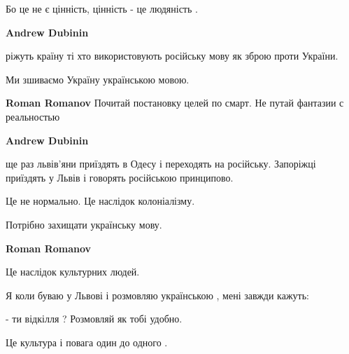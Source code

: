 \begin{itemize}
\begin{itemize}
Бо це не є цінність, цінність - це людяність .

 
\textbf{Andrew Dubinin} 

ріжуть країну ті хто використовують російську мову як зброю проти України.

Ми зшиваємо Україну українською мовою.

 
\textbf{Roman Romanov}
Почитай постановку целей по смарт.
Не путай фантазии с реальностью

 
\textbf{Andrew Dubinin} 

ще раз львів'яни приїздять в Одесу і переходять на російську. Запоріжці
приїздять у Львів і говорять російською принципово.

Це не нормально. Це наслідок колоніалізму.

Потрібно захищати українську мову.

 
\textbf{Roman Romanov}

Це наслідок культурних людей.

Я коли буваю у Львові і розмовляю українською , мені завжди кажуть:

- ти відкілля ? Розмовляй як тобі удобно.

Це культура і повага один до одного .

 


\end{itemize}
\end{itemize}
